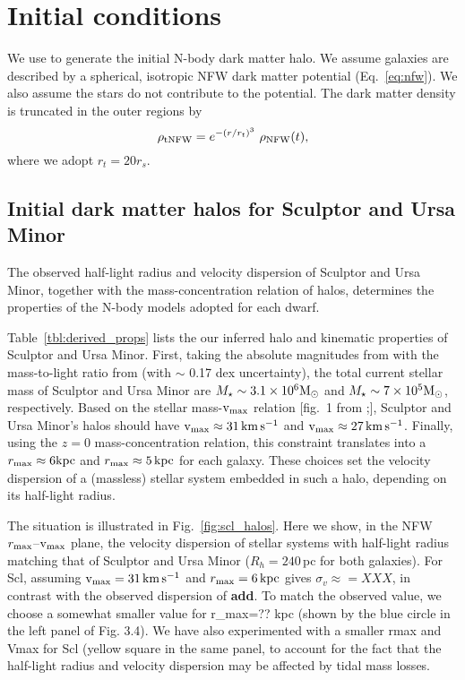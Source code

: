 \section{Initial conditions}\label{initial-conditions}

We use \agama{} \citep{agama} to generate the initial N-body dark matter
halo. We assume galaxies are described by a spherical, isotropic NFW
dark matter potential (Eq.~\ref{eq:nfw}). We also assume the stars do
not contribute to the potential. The dark matter density is truncated in
the outer regions by \begin{equation}{
\rho_{\rm tNFW} = e^{-(r/r_t)^3}\ \rho_{\rm NFW}(t),
}\end{equation} where we adopt \(r_t = 20 r_s\).

\subsection{Initial dark matter halos for Sculptor and Ursa
Minor}\label{initial-dark-matter-halos-for-sculptor-and-ursa-minor}

The observed half-light radius and velocity dispersion of Sculptor and
Ursa Minor, together with the mass-concentration relation of \LCDM{}
halos, determines the properties of the N-body models adopted for each
dwarf.

Table~\ref{tbl:derived_props} lists the our inferred halo and kinematic
properties of Sculptor and Ursa Minor. First, taking the absolute
magnitudes from \citet{munoz+2018} with the mass-to-light ratio from
\citet{woo+courteau+dekel2008} (with \(\sim\) 0.17 dex uncertainty), the
total current stellar mass of Sculptor and Ursa Minor are
\(M_\star \sim 3.1 \times 10^6 {\rm M}_{\odot}\) and
\(M_\star \sim 7 \times 10^5 {\rm M}_{\odot}\), respectively. Based on the stellar
mass-\({\rm v}_{\rm max}\) relation {[}fig.~1 from \citet{fattahi+2018};{]},
Sculptor and Ursa Minor's halos should have \({\rm v}_{\rm max} \approx 31 \,{\rm km\,s^{-1}}\)
and \({\rm v}_{\rm max} \approx 27\,{\rm km\,s^{-1}}\). Finally, using the \citet{ludlow+2016}
\(z=0\) mass-concentration relation, this constraint translates into a
\(r_{\rm max} \approx 6 {\rm kpc}\) and \(r_{\rm max} \approx 5\,{\rm kpc}\) for each
galaxy. These choices set the velocity dispersion of a (massless)
stellar system embedded in such a halo, depending on its half-light
radius.

The situation is illustrated in Fig.~\ref{fig:scl_halos}. Here we show,
in the NFW \(r_{\rm max}\)--\({\rm v}_{\rm max}\) plane, the velocity dispersion of
stellar systems with half-light radius matching that of Sculptor and
Ursa Minor (\(R_h=240\,\)pc for both galaxies). For Scl, assuming
\({\rm v}_{\rm max} = 31\,{\rm km\,s^{-1}}\) and \(r_{\rm max} = 6\,{\rm kpc}\) gives
\(\sigma_v \approx = XXX\), in contrast with the observed dispersion of
\textbf{add}. To match the observed value, we choose a somewhat smaller
value for r\_max=?? kpc (shown by the blue circle in the left panel of
Fig. 3.4). We have also experimented with a smaller rmax and Vmax for
Scl (yellow square in the same panel, to account for the fact that the
half-light radius and velocity dispersion may be affected by tidal mass
losses.


